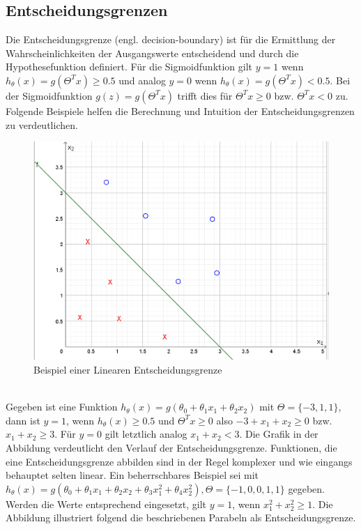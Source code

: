 \documentclass[a4paper]{scrreprt}
\begin{document}
\subsection{Entscheidungsgrenzen}
Die Entscheidungsgrenze (engl. decision-boundary) ist für die Ermittlung der Wahrscheinlichkeiten der Ausgangswerte entscheidend und durch die Hypothesefunktion definiert. Für die Sigmoidfunktion gilt $y=1$ wenn $h_{\theta}(x)=g(\Theta^Tx) \geq 0.5$ und analog $y=0$ wenn $h_{\theta}(x)=g(\Theta^Tx) < 0.5$. Bei der Sigmoidfunktion $g(z)=g(\Theta^Tx)$ trifft dies für $\Theta^Tx \geq 0$ bzw. $\Theta^Tx < 0$ zu. Folgende Beispiele helfen die Berechnung und Intuition der Entscheidungsgrenzen zu verdeutlichen.\\
%
\begin{figure}[h]
\centering
\includegraphics[scale=.74]{Abbildungen/Logistische_Regression_2}
\caption{Beispiel einer Linearen Entscheidungsgrenze}
\label{figure}
\end{figure}
\\
Gegeben ist eine Funktion $h_\theta(x)=g(\theta_{0}+\theta_{1}x_{1}+\theta_{2}x_{2})$ mit $\Theta=\{-3,1,1\}$, dann ist $y=1$, wenn $h_\theta(x) \geq 0.5$ und $\Theta^Tx \geq 0$ also $-3+x_{1}+x_{2} \geq 0$ bzw. $x_{1}+x_{2} \geq 3$. Für $y=0$ gilt letztlich analog $x_{1}+x_{2} < 3$. Die Grafik in der Abbildung verdeutlicht den Verlauf der Entscheidungsgrenze. Funktionen, die eine Entscheidungsgrenze abbilden sind in der Regel komplexer und wie eingangs behauptet selten linear. Ein beherrschbares Beispiel sei mit $h_\theta(x)=g(\theta_{0}+\theta_{1}x_{1}+\theta_{2}x_{2}+\theta_{3}x_{1}^2+\theta_{4}x_{2}^2), \Theta=\{-1,0,0,1,1\}$ gegeben. Werden die Werte entsprechend eingesetzt, gilt $y=1$, wenn $x_{1}^2+x_{2}^2 \geq 1$. Die Abbildung illustriert folgend die beschriebenen Parabeln als Entscheidungsgrenze.
\end{document}
